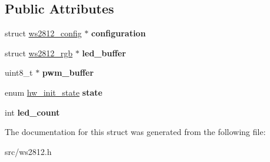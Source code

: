 \subsection*{Public Attributes}
\begin{DoxyCompactItemize}
\item 
\hypertarget{structws2812_a4b69cc515557cd305ebfd3372fc09f81}{}struct \hyperlink{structws2812__config}{ws2812\+\_\+config} $\ast$ {\bfseries configuration}\label{structws2812_a4b69cc515557cd305ebfd3372fc09f81}

\item 
\hypertarget{structws2812_a9d672a2d9ea381c7fcd940ba4ebdebe2}{}struct \hyperlink{structws2812__rgb}{ws2812\+\_\+rgb} $\ast$ {\bfseries led\+\_\+buffer}\label{structws2812_a9d672a2d9ea381c7fcd940ba4ebdebe2}

\item 
\hypertarget{structws2812_a61297f46cd5f505ca589214d93bcbc13}{}uint8\+\_\+t $\ast$ {\bfseries pwm\+\_\+buffer}\label{structws2812_a61297f46cd5f505ca589214d93bcbc13}

\item 
\hypertarget{structws2812_a396b295c928e75adc5688c49c832e631}{}enum \hyperlink{hw_8h_a3c02952100e7d051b77cdf060ca0ba9b}{hw\+\_\+init\+\_\+state} {\bfseries state}\label{structws2812_a396b295c928e75adc5688c49c832e631}

\item 
\hypertarget{structws2812_aaed6db83ce4a0e8e58b73650f2b4638e}{}int {\bfseries led\+\_\+count}\label{structws2812_aaed6db83ce4a0e8e58b73650f2b4638e}

\end{DoxyCompactItemize}


The documentation for this struct was generated from the following file\+:\begin{DoxyCompactItemize}
\item 
src/ws2812.\+h\end{DoxyCompactItemize}

